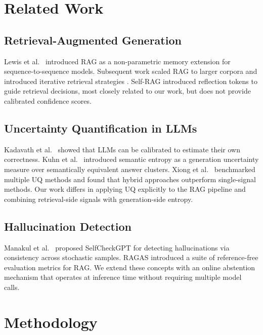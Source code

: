 \documentclass[conference]{IEEEtran}
\begin{document}
\section{Related Work}
\label{sec:related}

\subsection{Retrieval-Augmented Generation}
Lewis et al.\ \cite{lewis2020rag} introduced RAG as a non-parametric memory
extension for sequence-to-sequence models. Subsequent work scaled RAG to
larger corpora \cite{izacard2021leveraging} and introduced iterative retrieval
strategies \cite{shao2023iterative}. Self-RAG \cite{asai2023selfrag} introduced
reflection tokens to guide retrieval decisions, most closely related to our work,
but does not provide calibrated confidence scores.

\subsection{Uncertainty Quantification in LLMs}
Kadavath et al.\ \cite{kadavath2022language} showed that LLMs can be calibrated
to estimate their own correctness. Kuhn et al.\ \cite{kuhn2023semantic}
introduced semantic entropy as a generation uncertainty measure over
semantically equivalent answer clusters. Xiong et al.\ \cite{xiong2023llms}
benchmarked multiple UQ methods and found that hybrid approaches outperform
single-signal methods. Our work differs in applying UQ explicitly to the RAG
pipeline and combining retrieval-side signals with generation-side entropy.

\subsection{Hallucination Detection}
Manakul et al.\ \cite{manakul2023selfcheckgpt} proposed SelfCheckGPT for
detecting hallucinations via consistency across stochastic samples. RAGAS
\cite{es2023ragas} introduced a suite of reference-free evaluation metrics
for RAG. We extend these concepts with an online abstention mechanism that
operates at inference time without requiring multiple model calls.

\section{Methodology}
\label{sec:method}
\end{document}
